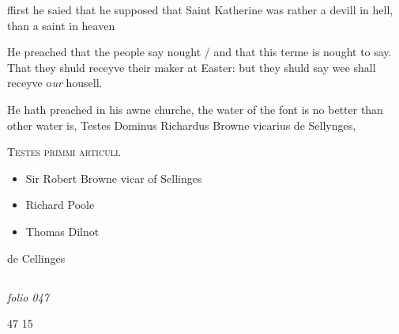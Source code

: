\documentclass[12pt, a4paper]{book}
\begin{document}
				\marginpar[\vspace{0.5cm}{\textcolor{Gray}{Errour}}]{}
			
		\ifthenelse{\isodd{\thepage}}
		{\reversemarginpar}
		{\normalmarginpar}
		ffirst he saied that he supposed that Saint
 Katherine was rather a devill in hell, than
 a saint in heaven
               	
				\marginpar[\vspace{0.5cm}{\textcolor{Gray}{herecie n}}]{}
			
               		
		\ifthenelse{\isodd{\thepage}}
		{\reversemarginpar}
		{\normalmarginpar}
		He preached that the people say nought / and that
 this terme is nought to say. That they shuld
 receyve their maker at Easter: but they shuld
 say wee shall receyve o\textit{ur} housell.
               			
				\marginpar[\vspace{0.5cm}{\textcolor{Gray}{n}}]{}
			
		\ifthenelse{\isodd{\thepage}}
		{\reversemarginpar}
		{\normalmarginpar}
		He hath preached in his awne churche, the water
of the font is no better than other water is,
 Testes Dominus Richardus Browne vicarius de Sellynges,

	\begin{center} {\scshape Testes primmi articuli.} \end{center}\begin{itemize}
		
		\item[]Sir Robert Browne vicar of Sellinges
		\item[]Richard Poole
		\item[]Thomas Dilnot
	\end{itemize}
	 de Cellinges



            
            
\dotfill
					  \subsection*{}

\textit{folio 047}


\begin{flushright}{\color{Mahogany}47} 15\end{flushright}
 
\end{document}
